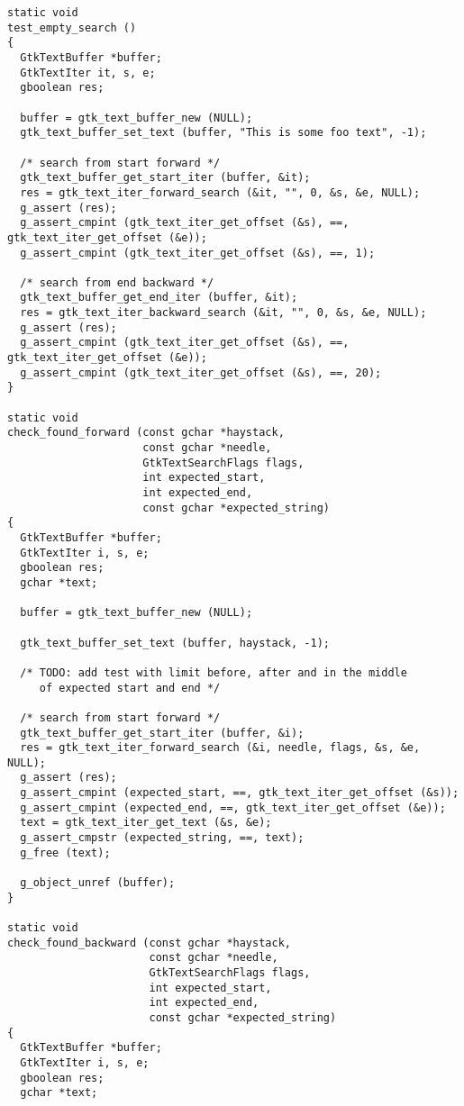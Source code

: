\begin{lstlisting}[style=GObject]
static void
test_empty_search ()
{
  GtkTextBuffer *buffer;
  GtkTextIter it, s, e;
  gboolean res;

  buffer = gtk_text_buffer_new (NULL);
  gtk_text_buffer_set_text (buffer, "This is some foo text", -1);

  /* search from start forward */
  gtk_text_buffer_get_start_iter (buffer, &it);
  res = gtk_text_iter_forward_search (&it, "", 0, &s, &e, NULL);
  g_assert (res);
  g_assert_cmpint (gtk_text_iter_get_offset (&s), ==, gtk_text_iter_get_offset (&e));
  g_assert_cmpint (gtk_text_iter_get_offset (&s), ==, 1);

  /* search from end backward */
  gtk_text_buffer_get_end_iter (buffer, &it);
  res = gtk_text_iter_backward_search (&it, "", 0, &s, &e, NULL);
  g_assert (res);
  g_assert_cmpint (gtk_text_iter_get_offset (&s), ==, gtk_text_iter_get_offset (&e));
  g_assert_cmpint (gtk_text_iter_get_offset (&s), ==, 20);
}

static void
check_found_forward (const gchar *haystack,
                     const gchar *needle,
                     GtkTextSearchFlags flags,
                     int expected_start,
                     int expected_end,
                     const gchar *expected_string)
{
  GtkTextBuffer *buffer;
  GtkTextIter i, s, e;
  gboolean res;
  gchar *text;

  buffer = gtk_text_buffer_new (NULL);

  gtk_text_buffer_set_text (buffer, haystack, -1);

  /* TODO: add test with limit before, after and in the middle
     of expected start and end */

  /* search from start forward */
  gtk_text_buffer_get_start_iter (buffer, &i);
  res = gtk_text_iter_forward_search (&i, needle, flags, &s, &e, NULL);
  g_assert (res);
  g_assert_cmpint (expected_start, ==, gtk_text_iter_get_offset (&s));
  g_assert_cmpint (expected_end, ==, gtk_text_iter_get_offset (&e));
  text = gtk_text_iter_get_text (&s, &e);
  g_assert_cmpstr (expected_string, ==, text);
  g_free (text);

  g_object_unref (buffer);
}

static void
check_found_backward (const gchar *haystack,
                      const gchar *needle,
                      GtkTextSearchFlags flags,
                      int expected_start,
                      int expected_end,
                      const gchar *expected_string)
{
  GtkTextBuffer *buffer;
  GtkTextIter i, s, e;
  gboolean res;
  gchar *text;


\end{lstlisting}

